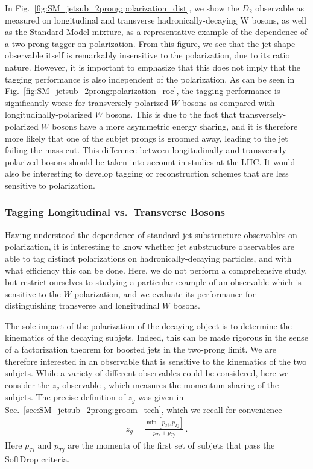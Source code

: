 In Fig.~\ref{fig:SM_jetsub_2prong:polarization_dist}, we show the $D_2$ observable as measured on longitudinal and transverse hadronically-decaying W bosons, as well as the Standard Model mixture, as a representative example of the dependence of a two-prong tagger on polarization.
%
From this figure, we see that the jet shape observable itself is remarkably insensitive to the polarization, due to its ratio nature.
%
However, it is important to emphasize that this does not imply that the tagging performance is also independent of the polarization.
%
As can be seen in Fig.~\ref{fig:SM_jetsub_2prong:polarization_roc}, the tagging performance is significantly worse for transversely-polarized $W$ bosons as compared with longitudinally-polarized $W$ bosons.
%
This is due to the fact that transversely-polarized $W$ bosons have a more asymmetric energy sharing, and it is therefore more likely that one of the subjet prongs is groomed away, leading to the jet failing the mass cut.
%
This difference between longitudinally and transversely-polarized bosons should be taken into account in studies at the LHC.
%
It would also be interesting to develop tagging or reconstruction schemes that are less sensitive to polarization.




\subsubsection{Tagging Longitudinal vs.\ Transverse Bosons}\label{sec:SM_jetsub_2prong:polar_tag}

Having understood the dependence of standard jet substructure observables on polarization, it is interesting to know whether jet substructure observables are able to tag distinct polarizations on hadronically-decaying particles, and with what efficiency this can be done.
%
Here, we do not perform a comprehensive study, but restrict ourselves to studying a particular example of an observable which is sensitive to the $W$ polarization, and we evaluate its performance for distinguishing transverse and longitudinal $W$ bosons. 

The sole impact of the polarization of the decaying object is to determine the kinematics of the decaying subjets.
%
Indeed, this can be made rigorous in the sense of a factorization theorem for boosted jets in the two-prong limit.
%
We are therefore interested in an observable that is sensitive to the kinematics of the two subjets.
%
While a variety of different observables could be considered, here we consider the $z_g$ observable \cite{Larkoski:2014wba,Larkoski:2014bia,Larkoski:2015lea}, which measures the momentum sharing of the subjets. The precise definition of $z_g$ was given in Sec.~\ref{sec:SM_jetsub_2prong:groom_tech}, which we recall for convenience
\begin{align}
z_g=\frac{\min\left[ p_{Ti}, p_{Tj}  \right]}{p_{Ti}+p_{Tj}}\,.
\end{align}
Here $p_{Ti}$ and $p_{Tj}$ are the momenta of the first set of subjets that pass the SoftDrop criteria.


